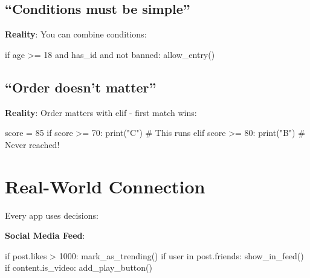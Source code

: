 \documentclass[
  letterpaper,
  DIV=11,
  numbers=noendperiod,
  oneside]{scrreprt}
\newenvironment{Shaded}{}{}
\newcommand{\BuiltInTok}[1]{\textcolor[rgb]{0.84,0.23,0.29}{#1}}
\newcommand{\CommentTok}[1]{\textcolor[rgb]{0.42,0.45,0.49}{#1}}
\newcommand{\ControlFlowTok}[1]{\textcolor[rgb]{0.84,0.23,0.29}{#1}}
\newcommand{\DecValTok}[1]{\textcolor[rgb]{0.00,0.36,0.77}{#1}}
\newcommand{\KeywordTok}[1]{\textcolor[rgb]{0.84,0.23,0.29}{#1}}
\newcommand{\NormalTok}[1]{\textcolor[rgb]{0.14,0.16,0.18}{#1}}
\newcommand{\OperatorTok}[1]{\textcolor[rgb]{0.14,0.16,0.18}{#1}}
\newcommand{\StringTok}[1]{\textcolor[rgb]{0.01,0.18,0.38}{#1}}
\begin{document}
\subsection{``Conditions must be
simple''}\label{conditions-must-be-simple}

\textbf{Reality}: You can combine conditions:

\begin{Shaded}
\begin{Highlighting}[]
\ControlFlowTok{if}\NormalTok{ age }\OperatorTok{\textgreater{}=} \DecValTok{18} \KeywordTok{and}\NormalTok{ has\_id }\KeywordTok{and} \KeywordTok{not}\NormalTok{ banned:}
\NormalTok{    allow\_entry()}
\end{Highlighting}
\end{Shaded}

\subsection{``Order doesn't matter''}\label{order-doesnt-matter}

\textbf{Reality}: Order matters with elif - first match wins:

\begin{Shaded}
\begin{Highlighting}[]
\NormalTok{score }\OperatorTok{=} \DecValTok{85}
\ControlFlowTok{if}\NormalTok{ score }\OperatorTok{\textgreater{}=} \DecValTok{70}\NormalTok{:}
    \BuiltInTok{print}\NormalTok{(}\StringTok{"C"}\NormalTok{)  }\CommentTok{\# This runs}
\ControlFlowTok{elif}\NormalTok{ score }\OperatorTok{\textgreater{}=} \DecValTok{80}\NormalTok{:}
    \BuiltInTok{print}\NormalTok{(}\StringTok{"B"}\NormalTok{)  }\CommentTok{\# Never reached!}
\end{Highlighting}
\end{Shaded}

\section{Real-World Connection}\label{real-world-connection-3}

Every app uses decisions:

\textbf{Social Media Feed}:

\begin{Shaded}
\begin{Highlighting}[]
\ControlFlowTok{if}\NormalTok{ post.likes }\OperatorTok{\textgreater{}} \DecValTok{1000}\NormalTok{:}
\NormalTok{    mark\_as\_trending()}
\ControlFlowTok{if}\NormalTok{ user }\KeywordTok{in}\NormalTok{ post.friends:}
\NormalTok{    show\_in\_feed()}
\ControlFlowTok{if}\NormalTok{ content.is\_video:}
\NormalTok{    add\_play\_button()}
\end{Highlighting}
\end{Shaded}
\end{document}
